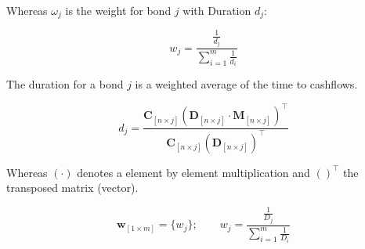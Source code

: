 Whereas $\omega_j$ is the weight for bond $j$ with Duration $d_j$:

\begin{displaymath}
    w_j=\frac{\frac{1}{d_j}}{\sum_{i=1}^m\frac{1}{d_i}}
\end{displaymath}


The duration for a bond $j$ is a weighted average of the time to cashflows.

\begin{equation}\label{duration}
d_j= \frac{\bm{C}_{\left[n \times j\right]} \left(\bm{D}_{\left[n\times j\right]} \cdot \bm{M}_{\left[n\times j\right]}\right)^{\top}} {\bm{C}_{\left[n \times j\right]}\left(\bm{D}_{\left[n\times j\right]}\right)^{\top}}
\end{equation}

Whereas $(\cdot)$ denotes a element by element multiplication and $( )^{\top}$ the transposed matrix (vector).



\begin{equation}\label{eq:weights}
  \bm{w}_{\left[1\times m\right]}= \{w_j\}; \qquad   w_j=\frac{\frac{1}{D_j}}{\sum_{i=1}^m\frac{1}{D_i}}
\end{equation}


